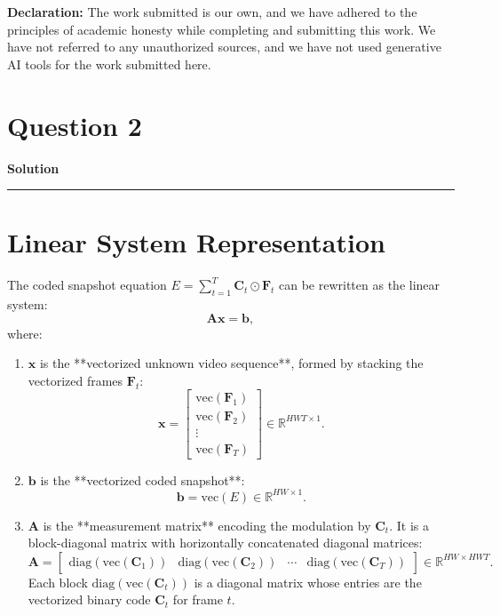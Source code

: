 \documentclass[a4paper,12pt]{article}
\title{\cooltitle{CS754 Assignment-3}}
\author{{\bf Saksham Rathi, Ekansh Ravi Shankar, Kshitij Vaidya}}
\date{}
\newenvironment{solution}[2][]{%
    \begin{mdframed}[linecolor=blue!70!black, linewidth=2pt, roundcorner=10pt, backgroundcolor=yellow!10!white, skipabove=12pt, skipbelow=12pt]%
        \textbf{\large #2}
        \par\noindent\rule{\textwidth}{0.4pt}
}{
    \end{mdframed}
}
\begin{document}
\maketitle
\textbf{Declaration:} The work submitted is our own, and
we have adhered to the principles of academic honesty while completing and submitting this work. We have not referred to any unauthorized sources, and we have not used generative AI tools for the work submitted here.

\section*{Question 2}

\begin{solution}{Solution}

  \section{Linear System Representation}
  The coded snapshot equation \( E = \sum_{t=1}^T \mathbf{C}_t \odot \mathbf{F}_t \) can be rewritten as the linear system:
  \[
  \mathbf{A} \mathbf{x} = \mathbf{b},
  \]
  where:
  \begin{enumerate}
      \item \(\mathbf{x}\) is the **vectorized unknown video sequence**, formed by stacking the vectorized frames \(\mathbf{F}_t\):
      \[
      \mathbf{x} = \begin{bmatrix}
      \text{vec}(\mathbf{F}_1) \\
      \text{vec}(\mathbf{F}_2) \\
      \vdots \\
      \text{vec}(\mathbf{F}_T)
      \end{bmatrix} \in \mathbb{R}^{HWT \times 1}.
      \]
      
      \item \(\mathbf{b}\) is the **vectorized coded snapshot**:
      \[
      \mathbf{b} = \text{vec}(E) \in \mathbb{R}^{HW \times 1}.
      \]
      
      \item \(\mathbf{A}\) is the **measurement matrix** encoding the modulation by \(\mathbf{C}_t\). It is a block-diagonal matrix with horizontally concatenated diagonal matrices:
      \[
      \mathbf{A} = \begin{bmatrix}
      \text{diag}(\text{vec}(\mathbf{C}_1)) & \text{diag}(\text{vec}(\mathbf{C}_2)) & \cdots & \text{diag}(\text{vec}(\mathbf{C}_T))
      \end{bmatrix} \in \mathbb{R}^{HW \times HWT}.
      \]
      Each block \(\text{diag}(\text{vec}(\mathbf{C}_t))\) is a diagonal matrix whose entries are the vectorized binary code \(\mathbf{C}_t\) for frame \(t\).
  \end{enumerate}

\end{solution}
\end{document}

